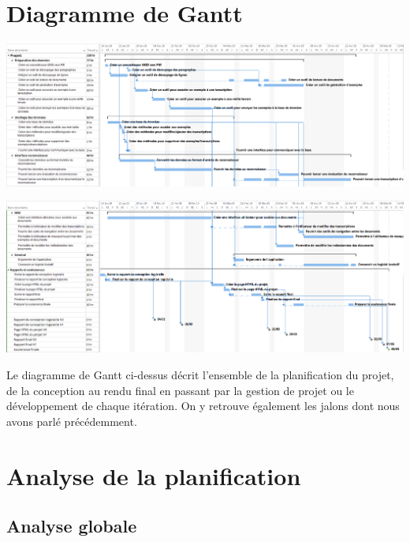 \section{Diagramme de Gantt}

\begin{mdframed}[frametitle={Figure 3 : Diagramme de Gantt du projet (1/2)}, innerbottommargin=10]
\begin{center}
\includegraphics[scale=0.35]{gantt_V2.1.PNG}
\end{center}
\end{mdframed}

\begin{mdframed}[frametitle={Figure 4 : Diagramme de Gantt du projet (2/2)}, innerbottommargin=10]
\begin{center}
\includegraphics[scale=0.35]{gantt_V2.2.PNG}
\end{center}
\end{mdframed}

Le diagramme de Gantt ci-dessus décrit l’ensemble de la planification du projet, de la conception au rendu final en passant par la gestion de projet ou le développement de chaque itération. On y retrouve également les jalons dont nous avons parlé précédemment.

\newpage

\section{Analyse de la planification}

\subsection{Analyse globale}

